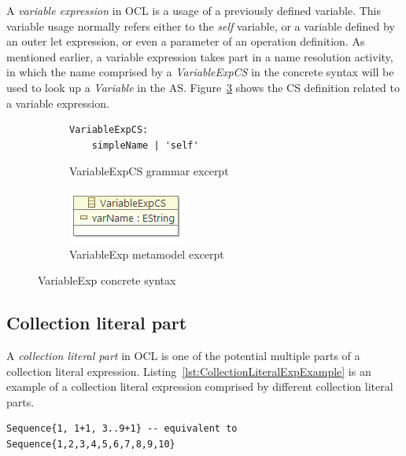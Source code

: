 \documentclass{llncs}
\begin{document}
A \textit{variable expression} in OCL is a usage of a previously defined variable. This variable usage normally refers either to the \emph{self} variable, or a variable defined by an outer let expression, or even a parameter of an operation definition. As mentioned earlier, a variable expression takes part in a name resolution activity, in which the name comprised by a \emph{VariableExpCS} in the concrete syntax will be used to look up a \emph{Variable} in the AS. Figure~\ref{fig:VariableExpCS} shows the CS definition related to a variable expression. 

\begin{figure}[htbp]
\centering
\begin{subfigure}{0.5\textwidth}
  \centering
 \begin{lstlisting}[label=lst:VariableExpEBNF, language=Xtext]
 VariableExpCS:
 	simpleName | 'self'
 \end{lstlisting} 
  \caption{VariableExpCS grammar excerpt}
  \label{fig:VariableExpCS:a}
\end{subfigure}%
\begin{subfigure}{0.5\textwidth}
  \centering
  \includegraphics[scale=0.75]{images/VariableExpCS.png}
  \caption{VariableExp metamodel excerpt}
  \label{fig:VariableExpCS:b}
\end{subfigure}
\caption{VariableExp concrete syntax}
\label{fig:VariableExpCS}
\end{figure}

\subsection{Collection literal part}

A \textit{collection literal part} in OCL is one of the potential multiple parts of a collection literal expression. Listing~\ref{lst:CollectionLiteralExpExample} is an example of a collection literal expression comprised by different collection literal parts.

\begin{lstlisting}[label=lst:CollectionLiteralExpExample, language=OCL]
Sequence{1, 1+1, 3..9+1} -- equivalent to Sequence{1,2,3,4,5,6,7,8,9,10}
\end{lstlisting}
\end{document}
